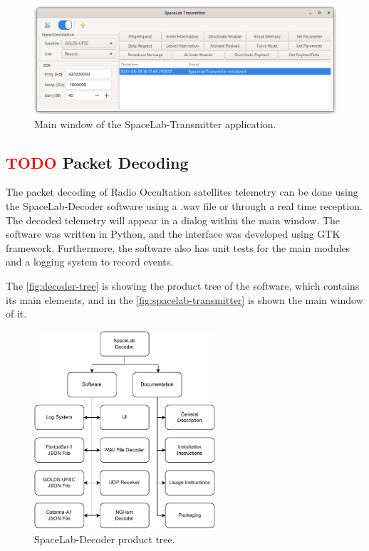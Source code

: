 \begin{figure}[!ht]
    \begin{center}
        \includegraphics[width=\textwidth]{figures/spacelab-transmitter-window.png}
        \caption{Main window of the SpaceLab-Transmitter application.}
        \label{fig:spacelab-transmitter}
    \end{center}
\end{figure}

\subsection{ \textcolor{red}{TODO} Packet Decoding}

The packet decoding of Radio Occultation satellites telemetry can be done using the SpaceLab-Decoder \cite{spacelab-decoder} software using a .wav file or through a real time reception. The decoded telemetry will appear in a dialog within the main window. The software was written in Python, and the interface was developed using GTK framework. Furthermore, the software also has unit tests for the main modules and a logging system to record events.

The \autoref{fig:decoder-tree} is showing the product tree of the software, which contains its main elements, and in the \autoref{fig:spacelab-transmitter} is shown the main window of it.

\begin{figure}[!ht]
    \begin{center}
        \includegraphics[width=0.6\textwidth]{figures/decoder_tree.pdf}
        \caption{SpaceLab-Decoder product tree.}
        \label{fig:decoder-tree}
    \end{center}
\end{figure}

